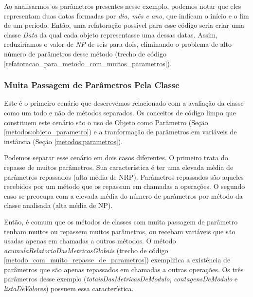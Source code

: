 Ao analisarmos os parâmetros presentes nesse exemplo, podemos notar que eles representam duas datas formadas por \textit{dia, mês e ano}, que indicam o início e o fim de um período. Então, uma refatoração possível para esse código seria criar uma classe \textit{Data} da qual cada objeto representasse uma dessas datas. Assim, reduziríamos o valor de \textit{NP} de seis para dois, eliminando o problema de alto número de parâmetros desse método (trecho de código \ref{refatoracao_para_metodo_com_muitos_parametros}). 
                                                                               
          
              

\subsubsection{Muita Passagem de Parâmetros Pela Classe}
	
Este é o primeiro cenário que descrevemos relacionado com a avaliação da classe como um todo e não de métodos separados. Os conceitos de código limpo que constituem este cenário são o uso de Objeto como Parâmetro (Seção \ref{metodos:objeto_parametro}) e a tranformação de parâmetros em variáveis de instância (Seção \ref{metodos:parametros}).
	
Podemos separar esse cenário em dois casos diferentes. O primeiro trata do repasse de muitos parâmetros. Sua característica é ter uma elevada média de parâmetros repassados (alta média de NRP). Parâmetros repassados são aqueles recebidos por um método que os repassam em chamadas a operações. O segundo caso se preocupa com a elevada média do número de parâmetros por método da classe analisada (alta média de NP).       
		     
Então, é comum que os métodos de classes com muita passagem de parâmetro tenham muitos ou repassem muitos parâmetros, ou recebam variáveis que são usadas apenas em chamadas a outros métodos.	O método \textit{acumulaRelatorioDasMetricasGlobais} (trecho de código \ref{metodo_com_muito_repasse_de_parametros}) exemplifica a existência de parâmetros que são apenas repassados em chamadas a outras operações. Os três parâmetros desse exemplo (\textit{totaisDasMetricasDeModulo}, \textit{contagensDeModulo} e \textit{listaDeValores}) possuem essa característica. 
	                                                               
